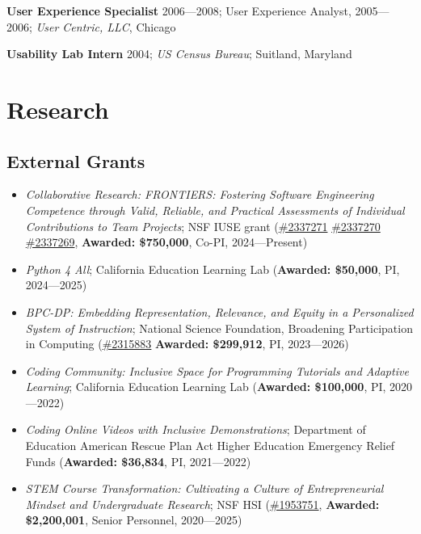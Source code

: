 \documentclass[10pt,letterpaper]{article}
\begin{document}
\vspace{2mm}
\textbf{User Experience Specialist} 2006---2008; User Experience Analyst, 2005---2006; \textit{User Centric, LLC}, Chicago

\vspace{2mm}
\textbf{Usability Lab Intern} 2004; \textit{US Census Bureau}; Suitland, Maryland

\section*{Research}
\subsection*{External Grants}
\begin{itemize}[leftmargin=1.5em,itemsep=2pt, topsep=0pt]
\item \textit{Collaborative Research: FRONTIERS: Fostering Software Engineering Competence through Valid, Reliable, and Practical Assessments of Individual Contributions to Team Projects}; NSF IUSE grant (\href{https://www.nsf.gov/awardsearch/show-award/?AWD_ID=2337271}{\#2337271} \href{https://www.nsf.gov/awardsearch/show-award/?AWD_ID=2337270}{\#2337270} \href{https://www.nsf.gov/awardsearch/show-award/?AWD_ID=2337269}{\#2337269}, \textbf{Awarded: \$750,000}, Co-PI, 2024---Present) 
\item \textit{Python 4 All}; California Education Learning Lab (\textbf{Awarded: \$50,000}, PI, 2024---2025) 
\item \textit{BPC-DP: Embedding Representation, Relevance, and Equity in a Personalized System of Instruction}; National Science Foundation, Broadening Participation in Computing (\href{https://www.nsf.gov/awardsearch/show-award/?AWD_ID=2315883}{\#2315883} \textbf{Awarded: \$299,912}, PI, 2023---2026) 
\item \textit{Coding Community: Inclusive Space for Programming Tutorials and Adaptive Learning}; California Education Learning Lab (\textbf{Awarded: \$100,000}, PI, 2020---2022) 
\item \textit{Coding Online Videos with Inclusive Demonstrations}; Department of Education American Rescue Plan Act Higher Education Emergency Relief Funds (\textbf{Awarded: \$36,834}, PI, 2021---2022) 
\item \textit{STEM Course Transformation: Cultivating a Culture of Entrepreneurial Mindset and Undergraduate Research}; NSF HSI (\href{https://www.nsf.gov/awardsearch/show-award/?AWD_ID=1953751}{\#1953751}, \textbf{Awarded: \$2,200,001}, Senior Personnel, 2020---2025) 
\end{itemize}
\end{document}
